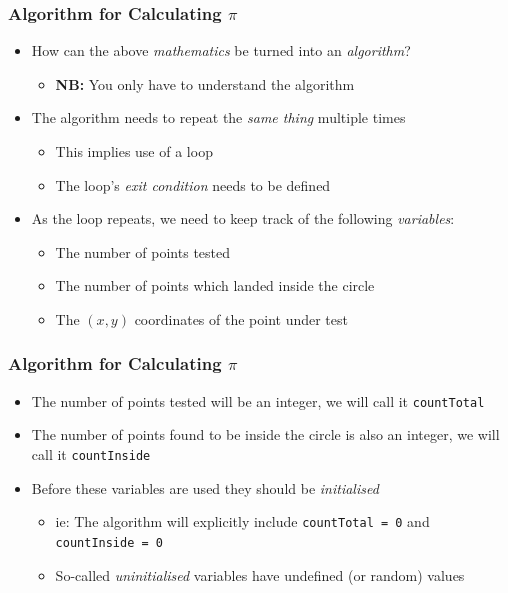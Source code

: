 \documentclass[14pt]{beamer}
\begin{document}
\begin{frame}
\frametitle{Algorithm for Calculating $\pi$}

\begin{itemize}
\item How can the above \textit{mathematics} be turned into an \textit{algorithm}?
	\begin{itemize}
		\item \textbf{NB:} You only have to understand the algorithm
	\end{itemize}
\pause
\item The algorithm needs to repeat the \textit{same thing} multiple times
	\begin{itemize}
			\item This implies use of a loop
			\item The loop's \textit{exit condition} needs to be defined
	\end{itemize}
\pause
\item As the loop repeats, we need to keep track of the following \textit{variables}:
		\begin{itemize}
			\item The number of points tested
			\item The number of points which landed inside the circle
			\item The $(x,y)$ coordinates of the point under test
		\end{itemize}


\end{itemize}	 
\end{frame}

\begin{frame}
\frametitle{Algorithm for Calculating $\pi$}
\begin{itemize}
\item The number of points tested will be an integer, we will call it \texttt{countTotal}
\item The number of points found to be inside the circle is also an integer, we will call it \texttt{countInside}
\item Before these variables are used they should be \textit{initialised}
	\begin{itemize}
		\item ie: The algorithm will explicitly include \texttt{countTotal = 0} and \texttt{countInside = 0}
		\item So-called \textit{uninitialised} variables have undefined (or random) values
	\end{itemize}
\end{itemize}
\end{frame}
\end{document}
